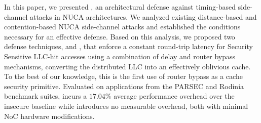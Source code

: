 In this paper, we presented \scheme{}, an architectural defense against timing-based side-channel attacks in NUCA architectures.
We analyzed existing distance-based and contention-based NUCA side-channel attacks and established the conditions necessary for an effective defense.
Based on this analysis, we proposed two defense techniques, \jscheme{} and \bscheme{}, that enforce a constant round-trip latency for Security Sensitive LLC-hit accesses using a combination of delay and router bypass mechanisms, converting the distributed LLC into an effectively oblivious cache.
To the best of our knowledge, this is the first use of router bypass as a cache security primitive.
Evaluated on applications from the PARSEC and Rodinia benchmark suites, \jscheme{} incurs a $17.04\%$ average performance overhead over the insecure baseline while \bscheme{} introduces no measurable overhead, both with minimal NoC hardware modifications.
